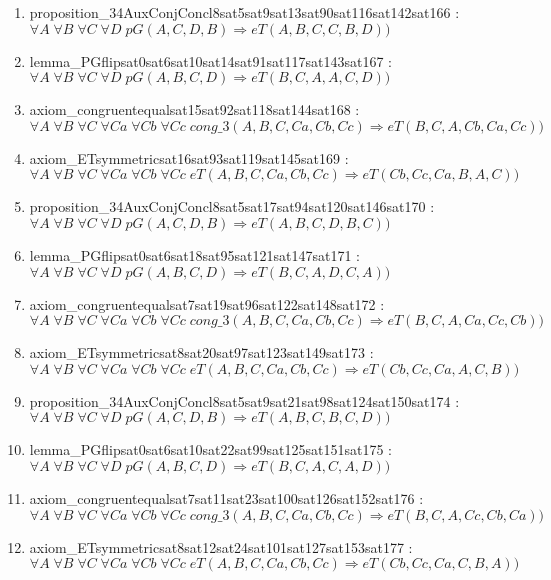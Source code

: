 \documentclass{article}
\begin{document}
\begin{enumerate}
\item proposition\_34AuxConjConcl8sat5sat9sat13sat90sat116sat142sat166 : $\forall A\;\forall B\;\forall C\;\forall D\;pG(A, C, D, B) \Rightarrow eT(A, B, C, C, B, D))$
\item lemma\_PGflipsat0sat6sat10sat14sat91sat117sat143sat167 : $\forall A\;\forall B\;\forall C\;\forall D\;pG(A, B, C, D) \Rightarrow eT(B, C, A, A, C, D))$
\item axiom\_congruentequalsat15sat92sat118sat144sat168 : $\forall A\;\forall B\;\forall C\;\forall Ca\;\forall Cb\;\forall Cc\;cong\_3(A, B, C, Ca, Cb, Cc) \Rightarrow eT(B, C, A, Cb, Ca, Cc))$
\item axiom\_ETsymmetricsat16sat93sat119sat145sat169 : $\forall A\;\forall B\;\forall C\;\forall Ca\;\forall Cb\;\forall Cc\;eT(A, B, C, Ca, Cb, Cc) \Rightarrow eT(Cb, Cc, Ca, B, A, C))$
\item proposition\_34AuxConjConcl8sat5sat17sat94sat120sat146sat170 : $\forall A\;\forall B\;\forall C\;\forall D\;pG(A, C, D, B) \Rightarrow eT(A, B, C, D, B, C))$
\item lemma\_PGflipsat0sat6sat18sat95sat121sat147sat171 : $\forall A\;\forall B\;\forall C\;\forall D\;pG(A, B, C, D) \Rightarrow eT(B, C, A, D, C, A))$
\item axiom\_congruentequalsat7sat19sat96sat122sat148sat172 : $\forall A\;\forall B\;\forall C\;\forall Ca\;\forall Cb\;\forall Cc\;cong\_3(A, B, C, Ca, Cb, Cc) \Rightarrow eT(B, C, A, Ca, Cc, Cb))$
\item axiom\_ETsymmetricsat8sat20sat97sat123sat149sat173 : $\forall A\;\forall B\;\forall C\;\forall Ca\;\forall Cb\;\forall Cc\;eT(A, B, C, Ca, Cb, Cc) \Rightarrow eT(Cb, Cc, Ca, A, C, B))$
\item proposition\_34AuxConjConcl8sat5sat9sat21sat98sat124sat150sat174 : $\forall A\;\forall B\;\forall C\;\forall D\;pG(A, C, D, B) \Rightarrow eT(A, B, C, B, C, D))$
\item lemma\_PGflipsat0sat6sat10sat22sat99sat125sat151sat175 : $\forall A\;\forall B\;\forall C\;\forall D\;pG(A, B, C, D) \Rightarrow eT(B, C, A, C, A, D))$
\item axiom\_congruentequalsat7sat11sat23sat100sat126sat152sat176 : $\forall A\;\forall B\;\forall C\;\forall Ca\;\forall Cb\;\forall Cc\;cong\_3(A, B, C, Ca, Cb, Cc) \Rightarrow eT(B, C, A, Cc, Cb, Ca))$
\item axiom\_ETsymmetricsat8sat12sat24sat101sat127sat153sat177 : $\forall A\;\forall B\;\forall C\;\forall Ca\;\forall Cb\;\forall Cc\;eT(A, B, C, Ca, Cb, Cc) \Rightarrow eT(Cb, Cc, Ca, C, B, A))$

\end{enumerate}
\end{document}
